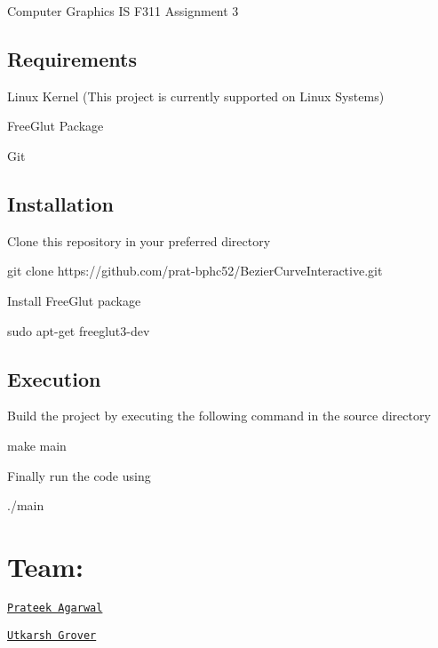 Computer Graphics IS F311 Assignment 3

\subsection*{Requirements}


\begin{DoxyItemize}
\item Linux Kernel (This project is currently supported on Linux Systems)
\item Free\+Glut Package
\item Git
\end{DoxyItemize}

\subsection*{Installation}


\begin{DoxyItemize}
\item Clone this repository in your preferred directory
\end{DoxyItemize}


\begin{DoxyCode}
git clone https://github.com/prat-bphc52/BezierCurveInteractive.git
\end{DoxyCode}

\begin{DoxyItemize}
\item Install Free\+Glut package
\end{DoxyItemize}


\begin{DoxyCode}
sudo apt-get freeglut3-dev
\end{DoxyCode}


\subsection*{Execution}

Build the project by executing the following command in the source directory


\begin{DoxyCode}
make main
\end{DoxyCode}


Finally run the code using 
\begin{DoxyCode}
./main
\end{DoxyCode}


\section*{Team\+:}


\begin{DoxyItemize}
\item \href{https://github.com/prat-bphc52/}{\tt Prateek Agarwal}
\item \href{https://github.com/utkgrover/}{\tt Utkarsh Grover} 
\end{DoxyItemize}